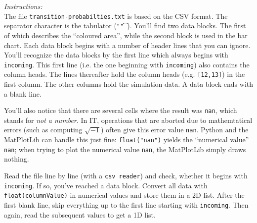 \documentclass[
	english,
	fontsize=10pt,
	parskip=half,
	titlepage=true,
	DIV=12
]{scrartcl}
\newcommand*{\inPy}[1]{\texttt{#1}}
\newcommand*{\ie}{i.\;e. }
\newcommand*{\eg}{e.\;g. }
\begin{document}
\emph{Instructions:}\\
The file \texttt{transition-probabilties.txt} is based on the CSV format. The separator character is the tabulator (\inPy{"\t"}). You'll find two data blocks. The first of which describes the \enquote{coloured area}, while the second block is used in the bar chart. Each data block begins with a number of header lines that you can ignore. You'll recognize the data blocks by the first line which always begins with \texttt{incoming}. This first line (\ie the one beginning with \texttt{incoming}) also contains the column heads. The lines thereafter hold the column heads (\eg \texttt{[12,13]}) in the first column. The other columns hold the simulation data. A data block ends with a blank line.

You'll also notice that there are several cells where the result was \texttt{nan}, which stands for \emph{not a number}. In IT, operations that are aborted due to mathemtatical errors (such as computing $\sqrt{-1}$) often give this error value \texttt{nan}. Python and the MatPlotLib can handle this just fine: \inPy{float("nan")} yields the \enquote{numerical value} \texttt{nan}; when trying to plot the numerical value \texttt{nan}, the MatPlotLib simply draws nothing.

Read the file line by line (with a \texttt{csv reader}) and check, whether it begins with \texttt{incoming}. If so, you've reached a data block. Convert all data with \inPy{float(columnValue)} in numerical values and store them in a 2D list. After the first blank line, skip everything up to the first line starting with \texttt{incoming}. Then again, read the subsequent values to get a 1D list.
\end{document}
